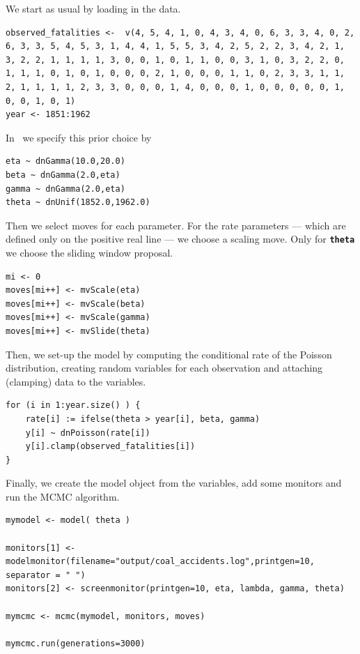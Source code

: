 \documentclass[11pt]{article}
\newcommand{\cl}[1]{{\texttt{\textbf{#1}}}}
\begin{document}
We start as usual by loading in the data.
{\tt \begin{snugshade*}
\begin{lstlisting} 
observed_fatalities <-  v(4, 5, 4, 1, 0, 4, 3, 4, 0, 6, 3, 3, 4, 0, 2, 6, 3, 3, 5, 4, 5, 3, 1, 4, 4, 1, 5, 5, 3, 4, 2, 5, 2, 2, 3, 4, 2, 1, 3, 2, 2, 1, 1, 1, 1, 3, 0, 0, 1, 0, 1, 1, 0, 0, 3, 1, 0, 3, 2, 2, 0, 1, 1, 1, 0, 1, 0, 1, 0, 0, 0, 2, 1, 0, 0, 0, 1, 1, 0, 2, 3, 3, 1, 1, 2, 1, 1, 1, 1, 2, 3, 3, 0, 0, 0, 1, 4, 0, 0, 0, 1, 0, 0, 0, 0, 0, 1, 0, 0, 1, 0, 1)
year <- 1851:1962
\end{lstlisting}
\end{snugshade*}}
In \Rev~we specify this prior choice by
{\tt \begin{snugshade*}
\begin{lstlisting} 
eta ~ dnGamma(10.0,20.0)
beta ~ dnGamma(2.0,eta)
gamma ~ dnGamma(2.0,eta)
theta ~ dnUnif(1852.0,1962.0)
\end{lstlisting}
\end{snugshade*}}
Then we select moves for each parameter.
For the rate parameters --- which are defined only on the positive real line --- we choose a scaling move.
Only for \cl{theta} we choose the sliding window proposal.
{\tt \begin{snugshade*}
\begin{lstlisting} 
mi <- 0
moves[mi++] <- mvScale(eta)
moves[mi++] <- mvScale(beta)
moves[mi++] <- mvScale(gamma)
moves[mi++] <- mvSlide(theta)
\end{lstlisting}
\end{snugshade*}}
Then, we set-up the model by computing the conditional rate of the Poisson distribution, creating random variables for each observation and attaching (clamping) data to the variables.
{\tt \begin{snugshade*}
\begin{lstlisting} 
for (i in 1:year.size() ) {
    rate[i] := ifelse(theta > year[i], beta, gamma)
    y[i] ~ dnPoisson(rate[i])
    y[i].clamp(observed_fatalities[i])
}
\end{lstlisting}
\end{snugshade*}}
Finally, we create the model object from the variables, add some monitors and run the MCMC algorithm.
{\tt \begin{snugshade*}
\begin{lstlisting} 
mymodel <- model( theta )

monitors[1] <- modelmonitor(filename="output/coal_accidents.log",printgen=10, separator = "	")
monitors[2] <- screenmonitor(printgen=10, eta, lambda, gamma, theta)

mymcmc <- mcmc(mymodel, monitors, moves)

mymcmc.run(generations=3000)
\end{lstlisting}
\end{snugshade*}}
\end{document}
